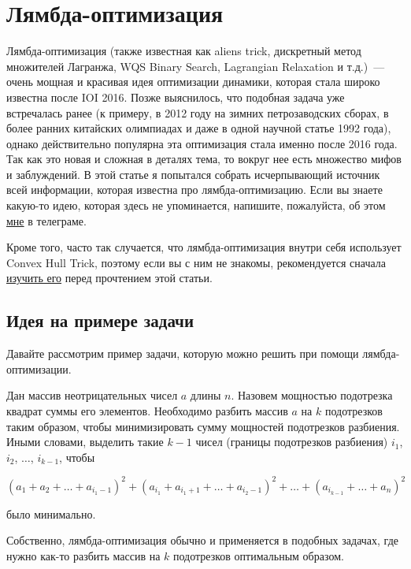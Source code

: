 \chapter{Лямбда-оптимизация} \label{lambda-optimization}

Лямбда-оптимизация (также известная как aliens trick, дискретный метод множителей Лагранжа, WQS Binary Search, Lagrangian Relaxation и т.д.)~--- очень мощная и красивая идея оптимизации динамики, которая стала широко известна после IOI 2016. Позже выяснилось, что подобная задача уже встречалась ранее (к примеру, в 2012 году на зимних петрозаводских сборах, в более ранних китайских олимпиадах и даже в одной научной статье 1992 года), однако действительно популярна эта оптимизация стала именно после 2016 года. Так как это новая и сложная в деталях тема, то вокруг нее есть множество мифов и заблуждений. В этой статье я попытался собрать исчерпывающий источник всей информации, которая известна про лямбда-оптимизацию. Если вы знаете какую-то идею, которая здесь не упоминается, напишите, пожалуйста, об этом \href{https://t.me/peltorator}{мне} в телеграме.

Кроме того, часто так случается, что лямбда-оптимизация внутри себя использует Convex Hull Trick, поэтому если вы с ним не знакомы, рекомендуется сначала \href{https://neerc.ifmo.ru/wiki/index.php?title=Convex_hull_trick}{изучить его} перед прочтением этой статьи.

\section{Идея на примере задачи}

Давайте рассмотрим пример задачи, которую можно решить при помощи лямбда-оптимизации.

\begin{problem}
    Дан массив неотрицательных чисел $a$ длины $n$. Назовем мощностью подотрезка квадрат суммы его элементов. Необходимо разбить массив $a$ на $k$ подотрезков таким образом, чтобы минимизировать сумму мощностей подотрезков разбиения. Иными словами, выделить такие $k - 1$ чисел (границы подотрезков разбиения) $i_1$, $i_2$, $\ldots$, $i_{k - 1}$, чтобы

    $$(a_1 + a_2 + \ldots + a_{i_1 - 1})^2 + (a_{i_1} + a_{i_1 + 1} + \ldots + a_{i_2 - 1})^2 + \ldots + (a_{i_{k - 1}} + \ldots + a_{n})^2$$

было минимально.
\end{problem}

Собственно, лямбда-оптимизация обычно и применяется в подобных задачах, где нужно как-то разбить массив на $k$ подотрезков оптимальным образом.

